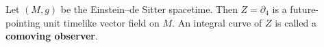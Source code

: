 Let $(M, g)$ be the Einstein--de Sitter spacetime. Then $Z = \partial_4$ is a future-pointing unit timelike vector field on $M$. An integral curve of $Z$ is called a \textbf{comoving observer}.
